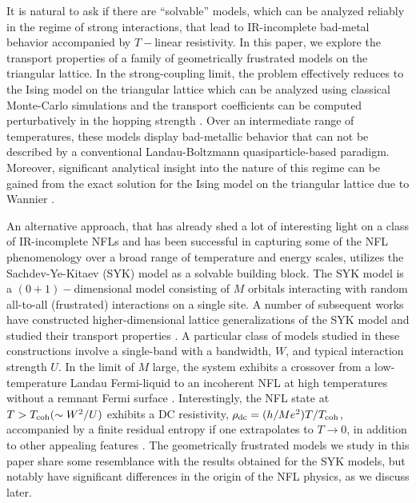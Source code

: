 \documentclass[aps,prx,onecolumn,amsmath,nofootinbib,amssymb,11pt]{revtex4-1}
\def \tn {\textnormal}
\begin{document}
It is natural to ask if there are ``solvable'' models, which can be analyzed reliably in the regime of strong interactions, that lead to IR-incomplete bad-metal behavior accompanied by $T-$linear resistivity. In this paper, we explore the transport properties of a family of geometrically frustrated models on the triangular lattice. In the strong-coupling limit, the problem effectively reduces to the Ising model on the triangular lattice which can be analyzed using classical Monte-Carlo simulations and the transport coefficients can be computed perturbatively in the hopping strength \cite{Hartnoll18}. Over an intermediate range of temperatures, these models display bad-metallic behavior that can not be described by a conventional Landau-Boltzmann quasiparticle-based paradigm. Moreover, significant analytical insight into the nature of this regime can be gained from the exact solution for the Ising model on the triangular lattice due to Wannier \cite{WannierTriaglat,WannierTriaglat2}. 


An alternative approach, that has already shed a lot of interesting light on a class of IR-incomplete NFLs and has been successful in capturing some of the NFL phenomenology over a broad range of temperature and energy scales, utilizes the Sachdev-Ye-Kitaev (SYK) model \cite{SY,kitaev_talk,Parcollet1,Parcollet2,Maldacena2016} as a solvable building block. The SYK model is a $(0+1)-$dimensional model consisting of $M$ orbitals interacting with random all-to-all (frustrated) interactions on a single site. A number of subsequent works have constructed higher-dimensional lattice generalizations of the SYK model and studied their transport properties \cite{Gu17,SS17,shenoy,Balents,Zhang17,mcgreevy,DVK17,Yao,SSmagneto,DC2018}. A particular class of models studied in these constructions involve a single-band with a bandwidth, $W$, and typical interaction strength $U$. In the limit of $M$ large, the system exhibits a crossover from a low-temperature Landau Fermi-liquid to an incoherent NFL at high temperatures without a remnant Fermi surface \cite{Parcollet1,Balents,DC2018}. Interestingly, the NFL state at $T>T_{\tn{coh}}(\sim W^2/U)$ exhibits a DC resistivity, $\rho_{\tn{dc}}=(h/Me^2) T/T_{\tn{coh}}$, accompanied by a finite residual entropy if one extrapolates to $T\rightarrow0$, in addition to other appealing features \cite{DC2018}. The geometrically frustrated models we study in this paper share some resemblance with the results obtained for the SYK models, but notably have significant differences in the origin of the NFL physics, as we discuss later. 
\end{document}
